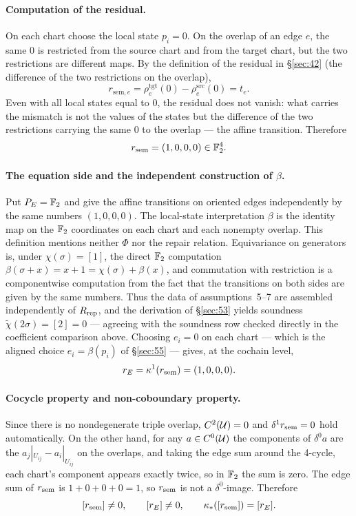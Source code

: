 \begin{example}
\paragraph{Computation of the residual.}
On each chart choose the local state $p_i=0$. On the overlap of an
edge $e$, the same $0$ is restricted from the source chart and from
the target chart, but the two restrictions are different maps. By the
definition of the residual in \S\ref{sec:42} (the difference of the
two restrictions on the overlap),
\[
r_{\mathrm{sem},e}
=\rho^{\mathrm{tgt}}_e(0)-\rho^{\mathrm{src}}_e(0)
=t_e.
\]
Even with all local states equal to $0$, the residual does not
vanish: what carries the mismatch is not the values of the states but
the difference of the two restrictions carrying the same $0$ to the
overlap --- the affine transition. Therefore
\[
r_{\mathrm{sem}}=(1,0,0,0)\in\mathbb{F}_{2}^4.
\]

\paragraph{The equation side and the independent construction of $\beta$.}
Put $P_{E}=\mathbb{F}_{2}$ and give the affine transitions on oriented edges
independently by the same numbers $(1,0,0,0)$. The local-state
interpretation $\beta$ is the identity map on the $\mathbb{F}_{2}$ coordinates
on each chart and each nonempty overlap. This definition mentions
neither $\Phi$ nor the repair relation. Equivariance on generators
is, under $\chi(\sigma)=[1]$, the direct $\mathbb{F}_{2}$ computation
$\beta(\sigma+x)=x+1=\chi(\sigma)+\beta(x)$, and commutation with
restriction is a componentwise computation from the fact that the
transitions on both sides are given by the same numbers. Thus the
data of assumptions~5--7 are assembled independently of $R_{\mathrm{rep}}$, and
the derivation of \S\ref{sec:53} yields soundness
$\widetilde\chi(2\sigma)=[2]=0$ --- agreeing with the soundness row
checked directly in the coefficient comparison above. Choosing
$e_i=0$ on each chart --- which is the aligned choice
$e_i=\beta(p_i)$ of \S\ref{sec:55} --- gives, at the cochain level,
\[
r_{E}=\kappa^1(r_{\mathrm{sem}})=(1,0,0,0).
\]

\paragraph{Cocycle property and non-coboundary property.}
Since there is no nondegenerate triple overlap, $C^2(\mathcal{U})=0$ and
$\delta^1r_{\mathrm{sem}}=0$ hold automatically. On the other hand, for any
$a\in C^0(\mathcal{U})$ the components of $\delta^0a$ are the
$a_j|_{U_{ij}}-a_i|_{U_{ij}}$ on the overlaps, and taking the edge sum around the
4-cycle, each chart's component appears exactly twice, so in $\mathbb{F}_{2}$
the sum is zero. The edge sum of $r_{\mathrm{sem}}$ is $1+0+0+0=1$, so $r_{\mathrm{sem}}$
is not a $\delta^0$-image. Therefore
\[
[r_{\mathrm{sem}}]\ne0,\qquad
[r_{E}]\ne0,\qquad
\kappa_*([r_{\mathrm{sem}}])=[r_{E}].
\]


\end{example}
